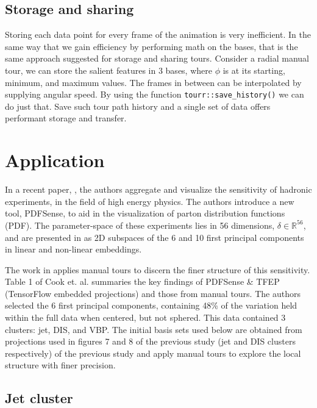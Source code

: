 \documentclass{monashthesis}
\begin{document}
\subsection{Storage and sharing}\label{storage-and-sharing}

Storing each data point for every frame of the animation is very
inefficient. In the same way that we gain efficiency by performing math
on the bases, that is the same approach suggested for storage and
sharing tours. Consider a radial manual tour, we can store the salient
features in 3 bases, where \(\phi\) is at its starting, minimum, and
maximum values. The frames in between can be interpolated by supplying
angular speed. By using the function \texttt{tourr::save\_history()} we
can do just that. Save such tour path history and a single set of data
offers performant storage and transfer.

\section{Application}\label{sec:application}

In a recent paper, \textcite{wang_visualizing_2018}, the authors
aggregate and visualize the sensitivity of hadronic experiments, in the
field of high energy physics. The authors introduce a new tool,
PDFSense, to aid in the visualization of parton distribution functions
(PDF). The parameter-space of these experiments lies in 56 dimensions,
\(\delta \in \mathbb{R}^{56}\), and are presented in as 2D subspaces of
the 6 and 10 first principal components in linear and non-linear
embeddings.

The work in \textcite{cook_dynamical_2018} applies manual tours to
discern the finer structure of this sensitivity. Table 1 of Cook et. al.
summaries the key findings of PDFSense \& TFEP (TensorFlow embedded
projections) and those from manual tours. The authors selected the 6
first principal components, containing 48\% of the variation held within
the full data when centered, but not sphered. This data contained 3
clusters: jet, DIS, and VBP. The initial basis sets used below are
obtained from projections used in figures 7 and 8 of the previous study
(jet and DIS clusters respectively) of the previous study and apply
manual tours to explore the local structure with finer precision.

\subsection{Jet cluster}\label{jet-cluster}
\end{document}
